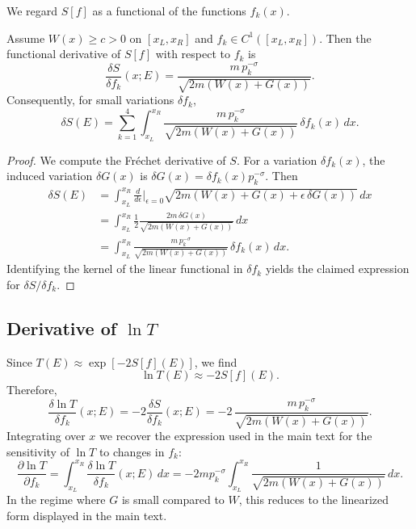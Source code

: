 \documentclass[11pt]{article}
\begin{document}
We regard \(S[f]\) as a functional of the functions \(f_k(x)\).

\begin{proposition}
Assume \(W(x)\ge c>0\) on \([x_L,x_R]\) and \(f_k \in C^1([x_L,x_R])\).
Then the functional derivative of \(S[f]\) with respect to \(f_k\) is
\begin{equation}
  \frac{\delta S}{\delta f_k}(x;E)
  = \frac{m\,p_k^{-\sigma}}{\sqrt{2m\left(W(x)+G(x)\right)}}.
\end{equation}
Consequently, for small variations \(\delta f_k\),
\begin{equation}
  \delta S(E)
  = \sum_{k=1}^4 \int_{x_L}^{x_R}
    \frac{m\,p_k^{-\sigma}}{\sqrt{2m\left(W(x)+G(x)\right)}}\,
    \delta f_k(x)\,dx.
\end{equation}
\end{proposition}

\begin{proof}
We compute the Fr{\'e}chet derivative of \(S\). For a variation
\(\delta f_k(x)\), the induced variation \(\delta G(x)\) is
\(\delta G(x) = \delta f_k(x)p_k^{-\sigma}\). Then
\begin{align}
  \delta S(E)
  &= \int_{x_L}^{x_R}
     \frac{d}{d\epsilon}\bigg|_{\epsilon=0}
     \sqrt{ 2m\left(W(x)+G(x)+\epsilon\,\delta G(x)\right)}\,dx \nonumber\\
  &= \int_{x_L}^{x_R}
     \frac{1}{2}
     \frac{ 2m\,\delta G(x) }
          { \sqrt{2m\left(W(x)+G(x)\right)} }\,dx \nonumber\\
  &= \int_{x_L}^{x_R}
     \frac{m\,p_k^{-\sigma}}{\sqrt{2m\left(W(x)+G(x)\right)}}\,
     \delta f_k(x)\,dx.
\end{align}
Identifying the kernel of the linear functional in \(\delta f_k\) yields
the claimed expression for \(\delta S/\delta f_k\).
\end{proof}

\subsection{Derivative of \(\ln T\)}

Since \(T(E) \approx \exp[-2 S[f](E)]\), we find
\begin{equation}
  \ln T(E) \approx -2 S[f](E).
\end{equation}
Therefore,
\begin{equation}
  \frac{\delta \ln T}{\delta f_k}(x;E)
  = -2 \frac{\delta S}{\delta f_k}(x;E)
  = -2\,\frac{m\,p_k^{-\sigma}}{\sqrt{2m\left(W(x)+G(x)\right)}}.
\end{equation}
Integrating over \(x\) we recover the expression used in the main text
for the sensitivity of \(\ln T\) to changes in \(f_k\):
\begin{equation}
  \frac{\partial \ln T}{\partial f_k}
  = \int_{x_L}^{x_R}
    \frac{\delta \ln T}{\delta f_k}(x;E)\,dx
  = -2m p_k^{-\sigma}
    \int_{x_L}^{x_R}
    \frac{1}{\sqrt{2m\left(W(x)+G(x)\right)}}\,dx.
\end{equation}
In the regime where \(G\) is small compared to \(W\), this reduces to
the linearized form displayed in the main text.
\end{document}
